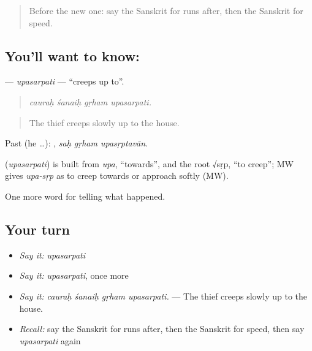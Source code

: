 \begin{quote}
Before the new one: say the Sanskrit for runs after, then the Sanskrit for speed.
\end{quote}

\subsection*{You'll want to know: }
\textbf{} — \emph{upasarpati} — \textquotedblleft{}creeps up to\textquotedblright{}.

\begin{quote}
   
\end{quote}

\begin{quote}
\emph{cauraḥ śanaiḥ gṛham upasarpati.}
\end{quote}

\begin{quote}
The thief creeps slowly up to the house.
\end{quote}

Past (he …):   , \emph{saḥ gṛham upasṛptavān}.

\begin{cousinweb}
\textbf{} (\emph{upasarpati}) is built from \emph{upa}, \textquotedblleft{}towards\textquotedblright{}, and the root √sṛp, \textquotedblleft{}to creep\textquotedblright{}; MW gives \emph{upa-sṛp} as to creep towards or approach softly (MW).
\end{cousinweb}

\begin{grammarlens}[title={What you've built}]
One more word for telling what happened.
\end{grammarlens}

\subsection*{Your turn}
\begin{itemize}
\raggedright
  \item \emph{Say it:} \emph{upasarpati}
  \item \emph{Say it:} \emph{upasarpati}, once more
  \item \emph{Say it:} \emph{cauraḥ śanaiḥ gṛham upasarpati.} — The thief creeps slowly up to the house.
  \item \emph{Recall:} say the Sanskrit for runs after, then the Sanskrit for speed, then say \emph{upasarpati} again
\end{itemize}

